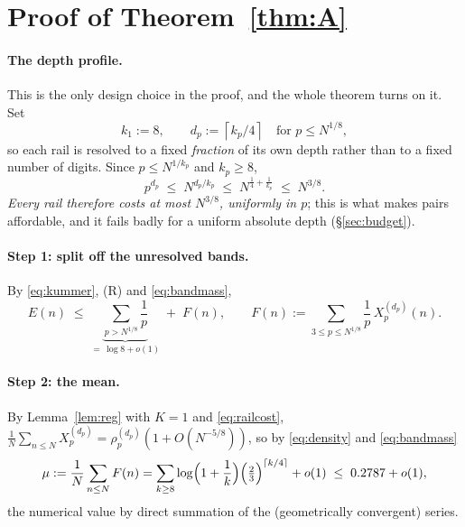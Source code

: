 \documentclass[11pt]{article}
\newcommand{\cl}[1]{\left\lceil #1\right\rceil}
\begin{document}
\section{Proof of Theorem~\ref{thm:A}}

\paragraph{The depth profile.}
This is the only design choice in the proof, and the whole theorem turns on it.  Set
\begin{equation}\label{eq:profile}
k_1:=8,\qquad d_p:=\cl{k_p/4}\quad\text{for }p\le N^{1/8},
\end{equation}
so each rail is resolved to a fixed \emph{fraction} of its own depth rather than to a
fixed number of digits.  Since $p\le N^{1/k_p}$ and $k_p\ge8$,
\begin{equation}\label{eq:railcost}
p^{d_p}\;\le\;N^{d_p/k_p}\;\le\;N^{\frac14+\frac1{k_p}}\;\le\;N^{3/8}.
\end{equation}
\emph{Every rail therefore costs at most $N^{3/8}$, uniformly in $p$}; this is what
makes pairs affordable, and it fails badly for a uniform absolute depth
(\S\ref{sec:budget}).

\paragraph{Step 1: split off the unresolved bands.}
By \eqref{eq:kummer}, (R) and \eqref{eq:bandmass},
\begin{equation}\label{eq:splitA}
E(n)\;\le\;\underbrace{\sum_{p>N^{1/8}}\frac1p}_{=\,\log 8+o(1)}\;+\;F(n),
\qquad
F(n):=\sum_{3\le p\le N^{1/8}}\frac1p\,X_p^{(d_p)}(n).
\end{equation}

\paragraph{Step 2: the mean.}
By Lemma~\ref{lem:reg} with $K=1$ and \eqref{eq:railcost},
$\frac1N\sum_{n\le N}X_p^{(d_p)}=\rho_p^{(d_p)}(1+O(N^{-5/8}))$, so by
\eqref{eq:density} and \eqref{eq:bandmass}
\begin{equation}\label{eq:meanA}
\mu:=\frac1N\sum_{n\le N}F(n)
=\sum_{k\ge8}\log\Bigl(1+\frac1k\Bigr)\Bigl(\tfrac23\Bigr)^{\cl{k/4}}+o(1)
\;\le\;0.2787+o(1),
\end{equation}
the numerical value by direct summation of the (geometrically convergent) series.
\end{document}
